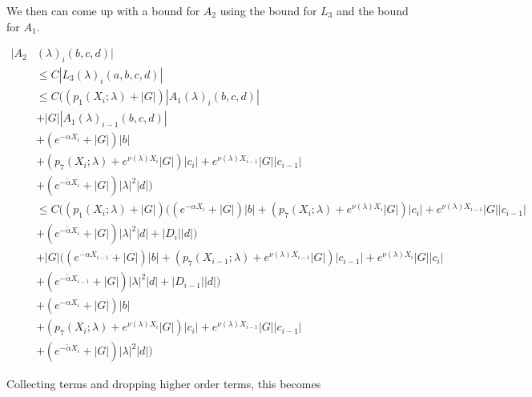 \documentclass[12pt]{article}
\begin{document}
\begin{enumerate}
We then can come up with a bound for $A_2$ using the bound for $L_3$ and the bound for $A_1$.

\begin{align*}
|A_2&(\lambda)_i(b, c, d)| \\
&\leq C |L_3(\lambda)_i(a, b, c, d)| \\
&\leq C \Big( (p_1(X_i; \lambda) + |G|)|A_1(\lambda)_i(b, c, d)| \\
&+ |G||A_1(\lambda)_{i-1}(b, c, d)| \\
&+ (e^{-\alpha X_i} + |G|) |b| \\
&+ ( p_7(X_i; \lambda) + e^{\nu(\lambda)X_i} |G|) |c_i| + e^{\nu(\lambda)X_{i-1}} |G| |c_{i-1}| \\
&+ (e^{-\tilde{\alpha} X_i} + |G|) |\lambda|^2 |d| \Big) \\
&\leq C \Big( (p_1(X_i; \lambda) + |G|) ((e^{-\alpha X_i} + |G|) |b| 
+ ( p_7(X_i; \lambda) + e^{\nu(\lambda)X_i} |G|) |c_i| + e^{\nu(\lambda)X_{i-1}} |G| |c_{i-1}| \\
&+ (e^{-\tilde{\alpha} X_i} + |G|) |\lambda|^2 |d| + |D_i||d| )\\
&+ |G|((e^{-\alpha X_{i-1}} + |G|) |b| 
+ ( p_7(X_{i-1}; \lambda) + e^{\nu(\lambda)X_{i-1}} |G|) |c_{i-1}| + e^{\nu(\lambda)X_i} |G| |c_i| \\
&+ (e^{-\tilde{\alpha} X_{i-1}} + |G|) |\lambda|^2 |d| + |D_{i-1}||d| ) \\
&+ (e^{-\alpha X_i} + |G|) |b| \\
&+ ( p_7(X_i; \lambda) + e^{\nu(\lambda)X_i} |G|) |c_i| + e^{\nu(\lambda)X_{i-1}} |G| |c_{i-1}| \\
&+ (e^{-\tilde{\alpha} X_i} + |G|) |\lambda|^2 |d| \Big)
\end{align*} 

Collecting terms and dropping higher order terms, this becomes


\end{enumerate}
\end{document}
